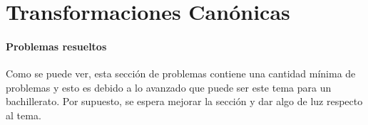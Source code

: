 \documentclass[/home/hernan/Documentos/Apuntes_mecanica_teorica/main.tex]{subfiles}
\begin{document}
    \part{Transformaciones Canónicas}
    


    \subsection{Problemas resueltos}
    Como se puede ver, esta sección de problemas contiene una cantidad mínima de problemas y esto es debido a lo avanzado que puede ser este tema para un bachillerato. Por supuesto, se espera mejorar la sección y dar algo de luz respecto al tema.
    
\end{document}
